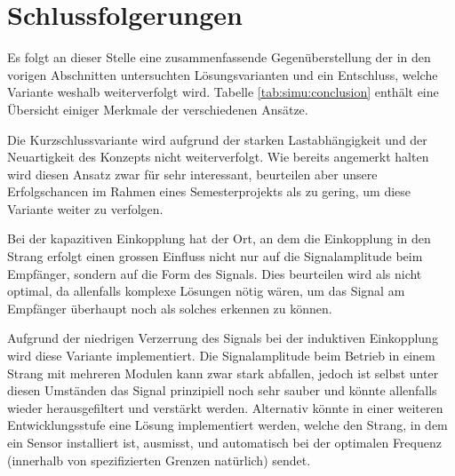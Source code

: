 \clearpage
\section{Schlussfolgerungen}
\label{subsec:simu:conclusion}

Es folgt  an dieser  Stelle eine  zusammenfassende Gegen\"uberstellung  der in
den vorigen  Abschnitten untersuchten  L\"osungsvarianten und  ein Entschluss,
welche Variante weshalb weiterverfolgt wird. Tabelle \ref{tab:simu:conclusion}
enth\"alt eine \"Ubersicht einiger Merkmale der verschiedenen Ans\"atze.

Die Kurzschlussvariante  wird aufgrund der starken  Lastabh\"angigkeit und der
Neuartigkeit des  Konzepts nicht weiterverfolgt. Wie bereits  angemerkt halten
wird  diesen  Ansatz  zwar  f\"ur sehr  interessant,  beurteilen  aber  unsere
Erfolgschancen  im  Rahmen eines  Semesterprojekts  als  zu gering,  um  diese
Variante weiter zu verfolgen.

Bei der  kapazitiven Einkopplung hat  der Ort, an  dem die Einkopplung  in den
Strang erfolgt einen  grossen Einfluss nicht nur auf  die Signalamplitude beim
Empf\"anger, sondern auf die Form  des Signals. Dies beurteilen wird als nicht
optimal, da allenfalls  komplexe L\"osungen n\"otig w\"aren, um  das Signal am
Empf\"anger \"uberhaupt noch als solches erkennen zu k\"onnen.

Aufgrund der niedrigen  Verzerrung des Signals bei  der induktiven Einkopplung
wird diese  Variante implementiert. Die Signalamplitude beim  Betrieb in einem
Strang mit mehreren Modulen kann zwar  stark abfallen, jedoch ist selbst unter
diesen  Umst\"anden  das Signal  prinzipiell  noch  sehr sauber  und  k\"onnte
allenfalls wieder herausgefiltert  und verst\"arkt werden. Alternativ k\"onnte
in einer weiteren Entwicklungsstufe eine L\"osung implementiert werden, welche
den Strang, in  dem ein Sensor installiert ist, ausmisst,  und automatisch bei
der  optimalen Frequenz  (innerhalb  von  spezifizierten Grenzen  nat\"urlich)
sendet.

